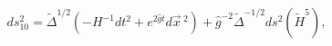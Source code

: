 \begin{equation}
ds_{10}^2 = \widetilde\Delta^{1/2}(-H^{-1}dt^2+e^{2\hat gt}
d\vec x\,^2)+\hat g^{-2}\widetilde\Delta^{-1/2}ds^2(\widetilde H^5),
\label{eq:bhten}
\end{equation}

